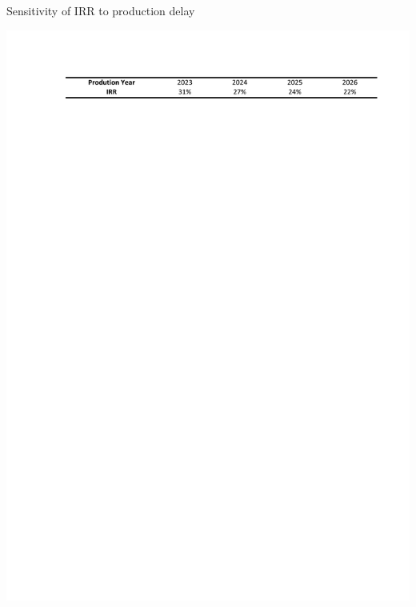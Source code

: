 \begin{table}[H]
    \centering
    \caption{Sensitivity of IRR to production delay}
    \includegraphics[clip, trim = 1cm 15cm 1cm 1cm, width=\linewidth]{chapters/6-economics/figures/sensitivity2.pdf}
    \label{tab:irr-delay}
\end{table}